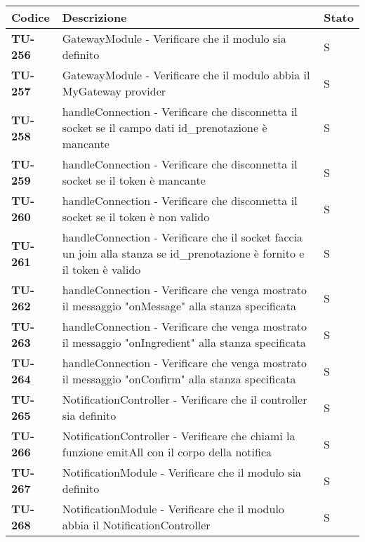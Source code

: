 \begin{longtable}{|>{\centering\arraybackslash}p{2cm}|p{15cm}|p{1cm}|}
  \hline
  \rowcolor{gray!30}
  \textbf{Codice} & \textbf{Descrizione} & \textbf{Stato} \\
  \hline
  \rowcolor{gray!10}
  \textbf{TU-256} & GatewayModule - Verificare che il modulo sia definito  & S \\
  \hline
  \rowcolor{gray!10}
  \textbf{TU-257} & GatewayModule - Verificare che il modulo abbia il MyGateway provider  & S \\
  \hline
  \rowcolor{gray!10}
  \textbf{TU-258} & handleConnection - Verificare che disconnetta il socket se il campo dati id\_prenotazione è mancante  & S \\
  \hline
  \rowcolor{gray!10}
  \textbf{TU-259} & handleConnection - Verificare che disconnetta il socket se il token è mancante  & S \\
  \hline
  \rowcolor{gray!10}
  \textbf{TU-260} & handleConnection - Verificare che disconnetta il socket se il token è non valido  & S \\
  \hline
  \rowcolor{gray!10}
  \textbf{TU-261} & handleConnection - Verificare che il socket faccia un join alla stanza se id\_prenotazione è fornito e il token è valido    & S \\
  \hline
  \rowcolor{gray!10}
  \textbf{TU-262} & handleConnection - Verificare che venga mostrato il messaggio "onMessage" alla stanza specificata   & S \\
  \hline
  \rowcolor{gray!10}
  \textbf{TU-263} & handleConnection - Verificare che venga mostrato il messaggio "onIngredient" alla stanza specificata   & S \\
  \hline
  \rowcolor{gray!10}
  \textbf{TU-264} & handleConnection - Verificare che venga mostrato il messaggio "onConfirm" alla stanza specificata   & S \\
  \hline
  \rowcolor{gray!10}
  \textbf{TU-265} & NotificationController - Verificare che il controller sia definito   & S \\
  \hline
  \rowcolor{gray!10}
  \textbf{TU-266} & NotificationController - Verificare che chiami la funzione emitAll con il corpo della notifica   & S \\
  \hline
  \rowcolor{gray!10}
  \textbf{TU-267} & NotificationModule - Verificare che il modulo sia definito   & S \\
  \hline
  \rowcolor{gray!10}
  \textbf{TU-268} & NotificationModule - Verificare che il modulo abbia il NotificationController & S \\

\end{longtable}
